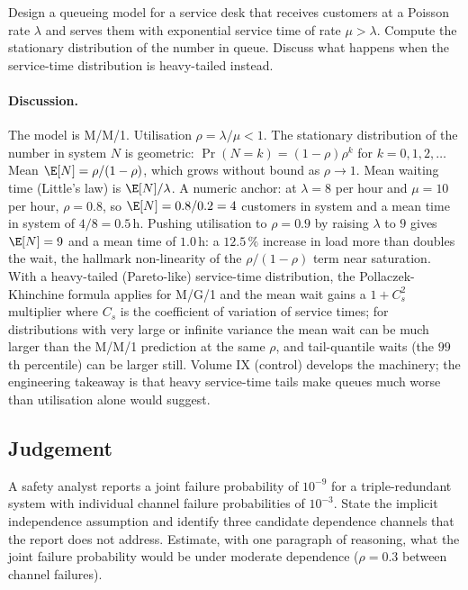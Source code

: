 \begin{exercise}
Design a queueing model for a service desk that receives customers
at a Poisson rate $\lambda$ and serves them with exponential
service time of rate $\mu > \lambda$. Compute the stationary
distribution of the number in queue. Discuss what happens when the
service-time distribution is heavy-tailed instead.
\end{exercise}

\paragraph{Discussion.}
The model is M/M/1. Utilisation $\rho = \lambda/\mu < 1$. The
stationary distribution of the number in system $N$ is geometric:
$\Pr(N = k) = (1 - \rho) \rho^{k}$ for $k = 0, 1, 2, \ldots$ Mean
$\E[N] = \rho/(1 - \rho)$, which grows without bound as $\rho \to
1$. Mean waiting time (Little's law) is $\E[N]/\lambda$. A numeric
anchor: at $\lambda = 8$ per hour and $\mu = 10$ per hour,
$\rho = 0.8$, so $\E[N] = 0.8/0.2 = 4$ customers in system and a
mean time in system of $4/8 = 0.5\,\text{h}$. Pushing utilisation to
$\rho = 0.9$ by raising $\lambda$ to $9$ gives $\E[N] = 9$ and a
mean time of $1.0\,\text{h}$: a $12.5\,\%$ increase in load more than
doubles the wait, the hallmark non-linearity of the
$\rho/(1 - \rho)$ term near saturation. With a
heavy-tailed (Pareto-like) service-time distribution, the
Pollaczek-Khinchine formula applies for M/G/1 and the mean wait
gains a $1 + C_{s}^{2}$ multiplier where $C_{s}$ is the coefficient
of variation of service times; for distributions with very large or
infinite variance the mean wait can be much larger than the M/M/1
prediction at the same $\rho$, and tail-quantile waits (the $99$th
percentile) can be larger still. Volume IX (control) develops the
machinery; the engineering takeaway is that heavy service-time
tails make queues much worse than utilisation alone would suggest.

\subsection*{Judgement}

\begin{exercise}
A safety analyst reports a joint failure probability of $10^{-9}$
for a triple-redundant system with individual channel failure
probabilities of $10^{-3}$. State the implicit independence
assumption and identify three candidate dependence channels that
the report does not address. Estimate, with one paragraph of
reasoning, what the joint failure probability would be under
moderate dependence ($\rho = 0.3$ between channel failures).
\end{exercise}

